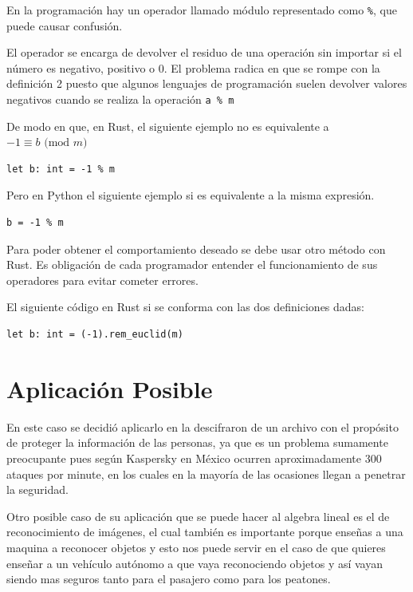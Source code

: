 \documentclass[a4paper]{article}
\begin{document}
\autocite{hill}

En la programación hay un operador llamado módulo representado como \texttt{\%}, que puede causar confusión.

El operador se encarga de devolver el residuo de una operación sin importar si el número es negativo, positivo o 0. El problema radica en que se rompe con la definición 2 puesto que algunos lenguajes de programación suelen devolver valores negativos cuando se realiza la operación \texttt{a \% m}

De modo en que, en Rust, el siguiente ejemplo no es equivalente a $-1 \equiv b \text{ (mod }m\text{)}$

\begin{verbatim}
let b: int = -1 % m 
\end{verbatim}

Pero en Python el siguiente ejemplo si es equivalente a la misma expresión.

\begin{verbatim}
b = -1 % m 
\end{verbatim}

Para poder obtener el comportamiento deseado se debe usar otro método con Rust. Es obligación de cada programador entender el funcionamiento de sus operadores para evitar cometer errores.

El siguiente código en Rust si se conforma con las dos definiciones dadas:

\begin{verbatim}
let b: int = (-1).rem_euclid(m)
\end{verbatim}

\newpage
\section{Aplicación Posible}

En este caso se decidió aplicarlo en la descifraron de un archivo con el propósito de proteger la información de las personas, ya que es un problema sumamente preocupante pues según Kaspersky en México ocurren aproximadamente 300 ataques por minute, en los cuales en la mayoría de las ocasiones llegan a penetrar la seguridad. 

Otro posible caso de su aplicación que se puede hacer al algebra lineal es el de reconocimiento de imágenes, el cual también es importante porque enseñas a una maquina a reconocer objetos y esto nos puede servir en el caso de que quieres enseñar a un vehículo autónomo a que vaya reconociendo objetos y así vayan siendo mas seguros tanto para el pasajero como para los peatones.
\end{document}
